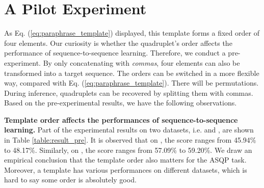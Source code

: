 \documentclass[11pt]{article}
\begin{document}
\begin{table}[]
\small
    \centering
    \caption{Evaluation results on various template orders in terms of precision (, \%), recall (, \%) and F1 (, \%) scores. All the reported results are the average of five runs. Full results are shown in the appendix, where some template orders outperform Paraphrase.}
    \label{table:result_pre}
\end{table}

\section{A Pilot Experiment}
As Eq. (\ref{eq:paraphrase_template}) displayed, this template forms a fixed order of four elements. Our curiosity is whether the quadruplet's order affects the performance of sequence-to-sequence learning. Therefore, we conduct a pre-experiment. By only concatenating with \emph{commas}, four elements can also be transformed into a target sequence. The orders can be switched in a more flexible way, compared with Eq. (\ref{eq:paraphrase_template}). There will be  permutations. During inference, quadruplets can be recovered by splitting them with commas. Based on the pre-experimental results, we have the following observations.



\textbf{Template order affects the performances of sequence-to-sequence learning.} \; Part of the experimental results on two datasets, i.e.  and , are shown in Table \ref{table:result_pre}. It is observed that on , the  score ranges from 45.94\% to 48.17\%. Similarly, on , the  score ranges from 57.09\% to 59.20\%. We draw an empirical conclusion that the template order also matters for the ASQP task. Moreover, a template has various performances on different datasets, which is hard to say some order is absolutely good.
\end{document}
